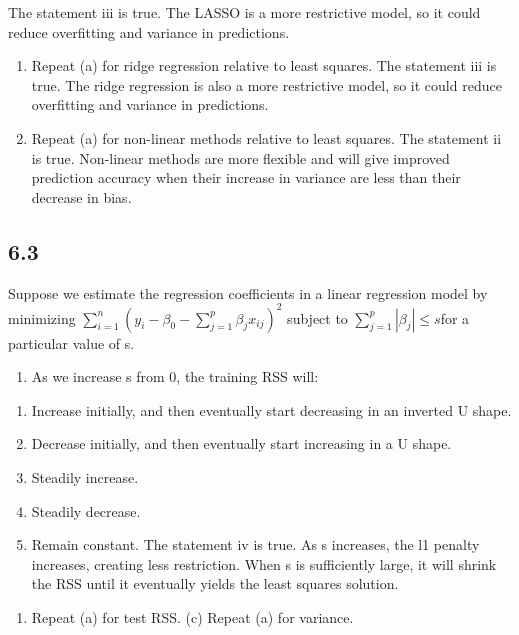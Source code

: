 \documentclass[]{article}
\providecommand{\tightlist}{%
  \setlength{\itemsep}{0pt}\setlength{\parskip}{0pt}}
\begin{document}
The statement iii is true. The LASSO is a more restrictive model, so it
could reduce overfitting and variance in predictions.

\begin{enumerate}
\def\labelenumi{(\alph{enumi})}
\setcounter{enumi}{1}
\item
  Repeat (a) for ridge regression relative to least squares. The
  statement iii is true. The ridge regression is also a more restrictive
  model, so it could reduce overfitting and variance in predictions.
\item
  Repeat (a) for non-linear methods relative to least squares. The
  statement ii is true. Non-linear methods are more flexible and will
  give improved prediction accuracy when their increase in variance are
  less than their decrease in bias.
\end{enumerate}

\subsection{6.3}\label{section-2}

Suppose we estimate the regression coefficients in a linear regression
model by minimizing
\(\sum_{i=1}^n(y_i-\beta_0-\sum_{j=1}^p\beta_jx_{ij})^2\) subject to
\(\sum_{j=1}^p|\beta_j|\le s\)for a particular value of s.

\begin{enumerate}
\def\labelenumi{(\alph{enumi})}
\tightlist
\item
  As we increase s from 0, the training RSS will:
\end{enumerate}

\begin{enumerate}
\def\labelenumi{\roman{enumi}.}
\tightlist
\item
  Increase initially, and then eventually start decreasing in an
  inverted U shape.
\item
  Decrease initially, and then eventually start increasing in a U shape.
\item
  Steadily increase.
\item
  Steadily decrease.
\item
  Remain constant. The statement iv is true. As s increases, the l1
  penalty increases, creating less restriction. When s is sufficiently
  large, it will shrink the RSS until it eventually yields the least
  squares solution.
\end{enumerate}

\begin{enumerate}
\def\labelenumi{(\alph{enumi})}
\setcounter{enumi}{1}
\tightlist
\item
  Repeat (a) for test RSS. (c) Repeat (a) for variance.
\end{enumerate}
\end{document}
